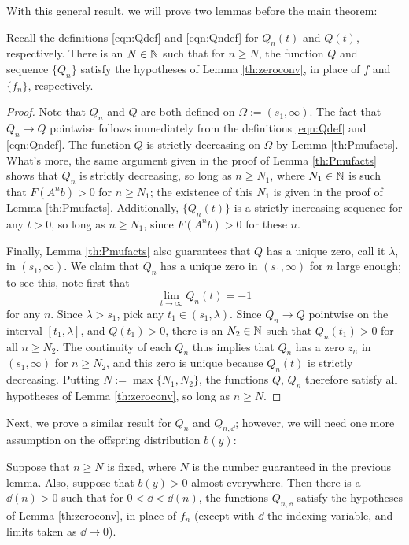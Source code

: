 With this general result, we will prove two lemmas before the main theorem:

\begin{lemma} \label{th:QandQn}
	Recall the definitions \eqref{eqn:Qdef} and \eqref{eqn:Qndef} for $Q_n(t)$ and $Q(t)$, respectively. There is an $N \in \mathbb{N}$ such that for $n \geq N$, the function $Q$ and sequence $\{Q_n\}$ satisfy the hypotheses of Lemma \ref{th:zeroconv}, in place of $f$ and $\{f_n\}$, respectively.
\end{lemma}

\begin{proof}
	Note that $Q_n$ and $Q$ are both defined on $\Omega:= (s_1, \infty)$. The fact that $Q_n \to Q$ pointwise follows immediately from the definitions \eqref{eqn:Qdef} and \eqref{eqn:Qndef}. The function $Q$ is strictly decreasing on $\Omega$ by Lemma \ref{th:Pmufacts}. What's more, the same argument given in the proof of Lemma \ref{th:Pmufacts} shows that $Q_n$ is strictly decreasing, so long as $n \geq N_1$, where $N_1 \in \mathbb{N}$ is such that $F(A^n b) > 0$ for $n \geq N_1$; the existence of this $N_1$ is given in the proof of Lemma \ref{th:Pmufacts}. Additionally, $\{Q_n(t)\}$ is a strictly increasing sequence for any $t > 0$, so long as $n \geq N_1$, since $F(A^n b )>0$ for these $n$.
	
	Finally, Lemma \ref{th:Pmufacts} also guarantees that $Q$ has a unique zero, call it $\lambda$, in $(s_1, \infty)$. We claim that $Q_n$ has a unique zero in $(s_1, \infty)$ for $n$ large enough; to see this, note first that 
	\[\lim_{t \to \infty} Q_n(t) = -1\]
	 for any $n$. Since $\lambda > s_1$, pick any $t_1 \in (s_1, \lambda)$. Since $Q_n \to Q$ pointwise on the interval $[t_1, \lambda]$, and $Q(t_1) > 0$, there is an $N_2 \in \mathbb{N}$ such that $Q_n(t_1) > 0$ for all $n \geq N_2$. The continuity of each $Q_n$ thus implies that $Q_n$ has a zero $z_n$ in $(s_1, \infty)$ for $n \geq N_2$, and this zero is unique because $Q_n(t)$ is strictly decreasing. Putting $N:= \max\{N_1, N_2\}$, the functions $Q$, $Q_n$ therefore satisfy all hypotheses of Lemma \ref{th:zeroconv}, so long as $n \geq N$.
\end{proof}

Next, we prove a similar result for $Q_n$ and $Q_{n, \dd}$; however, we will need one more assumption on the offspring distribution $b(y)$:

\begin{lemma} \label{th:QnandQnd}
	Suppose that $n \geq N$ is fixed, where $N$ is the number guaranteed in the previous lemma. Also, suppose that $b(y) > 0$ almost everywhere. Then there is a $\dd(n)>0$ such that for $0< \dd < \dd(n)$, the functions $Q_{n, \dd}$ satisfy the hypotheses of Lemma \ref{th:zeroconv}, in place of $f_n$ (except with $\dd$ the indexing variable, and limits taken as $\dd \to 0$).
\end{lemma}

